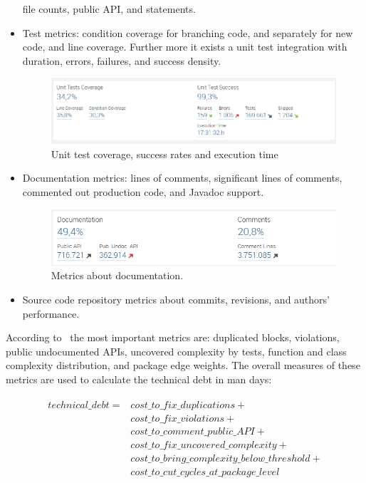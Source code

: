 \begin{itemize}
	file counts, public API, and statements.
	\item Test metrics: condition coverage for branching code, and separately 
	for new code, and line coverage. Further more it exists a unit test 
	integration with duration, errors, failures, and success density.
	\begin{figure}[h]
		\centering
		\includegraphics[scale=0.5]{img/unit_test_coverage.jpg}
		\caption{Unit test coverage, success rates and execution time} 
		\label{fig:unit_test_coverage}
	\end{figure}
	\item Documentation metrics: lines of comments, significant lines of comments, commented out production code, and Javadoc support.
	\begin{figure}[h]
		\centering
		\includegraphics[scale=0.5]{img/documentation.jpg}
		\caption{Metrics about documentation.} 
		\label{fig:documentation}
	\end{figure}
	\item Source code repository metrics about commits, revisions, and authors'
	performance.
\end{itemize}

According to~\cite{Gallaba} the most important metrics are: duplicated blocks, violations,
public undocumented APIs, uncovered complexity by tests, function and class
complexity distribution, and package edge weights.
The overall measures of these metrics are used to calculate the technical debt
in man days:

\begin{align}
	\begin{split}
		\label{eq:technical_debt_in_man_days}
		technical\_debt = & cost\_to\_fix\_duplications + \\
		 	& cost\_to\_fix\_violations + \\
		 	& cost\_to\_comment\_public\_API + \\
		 	& cost\_to\_fix\_uncovered\_complexity + 	\\
		 	& cost\_to\_bring\_complexity\_below\_threshold +\\
		 	& cost\_to\_cut\_cycles\_at\_package\_level
	\end{split}
\end{align}

